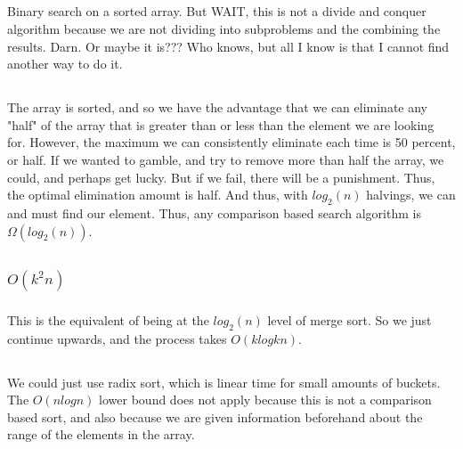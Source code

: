 \documentclass{article}
\begin{document}
\subsection{}Binary search on a sorted array. But WAIT, this is not a divide and conquer algorithm because we are not dividing into subproblems and the combining the results. Darn. Or maybe it is??? Who knows, but all I know is that I cannot find another way to do it. 
\subsection{}The array is sorted, and so we have the advantage that we can eliminate any "half" of the array that is greater than or less than the element we are looking for. However, the maximum we can consistently eliminate each time is 50 percent, or half. If we wanted to gamble, and try to remove more than half the array, we could, and perhaps get lucky. But if we fail, there will be a punishment. Thus, the optimal elimination amount is half. And thus, with $log_2(n)$ halvings, we can and must find our element. Thus, any comparison based search algorithm is $\Omega(log_2(n))$.
\subsection{}
\subsubsection{$O(k^2n)$}
\subsubsection{}This is the equivalent of being at the $log_2(n)$ level of merge sort. So we just continue upwards, and the process takes $O(klogkn)$.
\subsection{}We could just use radix sort, which is linear time for small amounts of buckets. The $O(nlogn)$ lower bound does not apply because this is not a comparison based sort, and also because we are given information beforehand about the range of the elements in the array. 
\subsection{}
\end{document}
